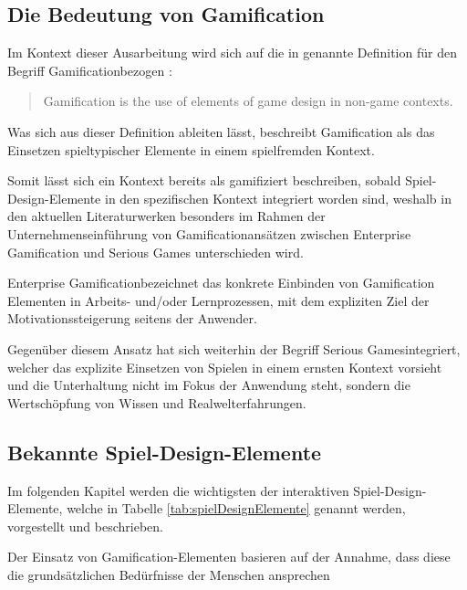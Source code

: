 \documentclass[bibliography=totoc,listof=totoc,BCOR=5mm,DIV=12,oneside]{scrbook}
\begin{document}
\subsection{Die Bedeutung von Gamification}
\par Im Kontext dieser Ausarbeitung wird sich auf die in \citep{deterding2011gamification} genannte Definition für den Begriff \grqq Gamification\grqq bezogen :
\begin{quotation} 
Gamification is the use of elements of game design in non-game contexts. 
\end{quotation}
\par Was sich aus dieser Definition ableiten lässt, beschreibt  Gamification als das Einsetzen spieltypischer Elemente in einem spielfremden Kontext.
\par Somit lässt sich ein Kontext bereits als \grqq gamifiziert\grqq{}
beschreiben, sobald Spiel-Design-Elemente in den spezifischen Kontext integriert worden sind, weshalb in den aktuellen Literaturwerken besonders im Rahmen der Unternehmenseinführung  von Gamificationansätzen zwischen Enterprise Gamification und Serious Games unterschieden wird\citep[vlg. Kapitel 1.1 Gamification: Definition und Abgrenzung, Seite 4]{Sailer2016}.
\par \bigskip \grqq Enterprise Gamification\grqq bezeichnet das konkrete Einbinden von Gamification Elementen in Arbeits- und/oder Lernprozessen, mit dem expliziten Ziel der Motivationssteigerung seitens der Anwender.
\par \bigskip Gegenüber diesem Ansatz hat sich weiterhin der Begriff \grqq Serious Games\grqq integriert, welcher das explizite Einsetzen von Spielen in einem ernsten Kontext vorsieht und die Unterhaltung nicht im Fokus der Anwendung steht, sondern die Wertschöpfung von Wissen und Realwelterfahrungen. 

\subsection{Bekannte Spiel-Design-Elemente} \label{sub:grundlagenSpielDesignElemente}

\par Im folgenden Kapitel werden die wichtigsten der interaktiven Spiel-Design-Elemente, welche in Tabelle \ref{tab:spielDesignElemente} genannt werden, vorgestellt und beschrieben. 
\par Der Einsatz von Gamification-Elementen basieren auf der Annahme, dass diese die grundsätzlichen Bedürfnisse der Menschen ansprechen\citep[Kapitel 1.1 Enterprise Gamification - Vorgehen und Anwendung, Seite 5]{Sailer2016}
\end{document}
